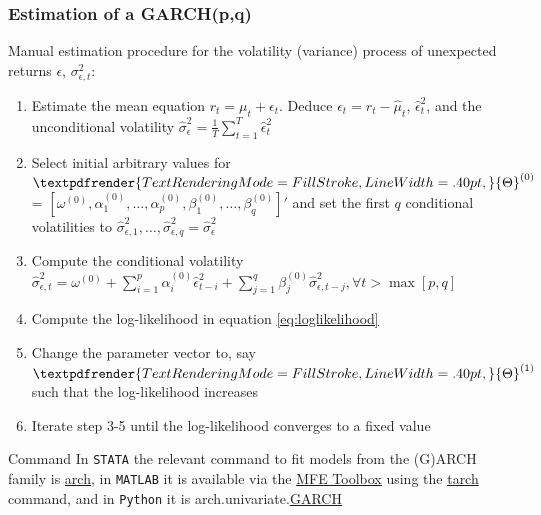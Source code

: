 \documentclass[xcolor=dvipsnames, english, 8pt]{beamer}
\newcommand*{\boldgreek}[1]{%
  \textpdfrender{%
    TextRenderingMode=FillStroke,%
    LineWidth=.40pt,%
  }{#1}%
}
\begin{document}
\begin{frame}
    \frametitle{Estimation of a GARCH(p,q)}
    Manual estimation procedure for the volatility (variance) process of unexpected returns $\epsilon$, $\sigma_{\epsilon,t}^2$:\vspace{0.25cm}\\
\begin{enumerate}[1.]
    \item Estimate the mean equation $r_t = \mu_t + \epsilon_t$. Deduce $\hat{\epsilon}_t = r_t - \hat{\mu}_t$, $\hat{\epsilon}_t^2$,  and the unconditional volatility $\hat{\sigma}_{\epsilon}^2 = \frac{1}{T}\sum_{t=1}^T \hat{\epsilon}_t^2$
    \item Select initial arbitrary values for $\boldgreek{\Theta}^{(0)}$ = $[\omega^{(0)}, \alpha_1^{(0)},\hdots,  \alpha_p^{(0)}, \beta_1^{(0)},\hdots,\beta_q^{(0)}]'$ and set the first $q$ conditional volatilities to $\hat{\sigma}_{\epsilon,1}^2,\hdots,\hat{\sigma}_{\epsilon,q}^2 = \hat{\sigma}_{\epsilon}^2$
    \item Compute the conditional volatility $\hat{\sigma}_{\epsilon,t}^2 = \omega^{(0)} +\sum\limits_{i=1}^p \alpha_i^{(0)}  \hat{\epsilon}_{t-i}^2 + \sum\limits_{j=1}^q \beta_j^{(0)}  \hat{\sigma}_{\epsilon,t-j}^2, \forall t>\max[p,q]$
    \item Compute the log-likelihood in equation \ref{eq:loglikelihood}
    \item Change the parameter vector to, say  $\boldgreek{\Theta}^{(1)}$ such that the log-likelihood increases
    \item Iterate step 3-5 until the log-likelihood converges to a fixed value\vspace{0.5cm}\\
\end{enumerate}

\vfill
\begin{exampleblock}{{\small{Command}}}
In  \texttt{STATA} the relevant command to fit models from the (G)ARCH family is \href{https://www.stata.com/manuals13/tsarch.pdf}{\color{Purple}arch}, in  \texttt{MATLAB} it is available via the \href{https://www.kevinsheppard.com/code/matlab/mfe-toolbox/}{\color{Purple}MFE Toolbox} using the \href{https://www.kevinsheppard.com/files/code/matlab/mfe-toolbox-documentation.pdf}{\color{Purple}tarch} command, and in \texttt{Python} it is arch.univariate.\href{https://arch.readthedocs.io/en/latest/univariate/generated/arch.univariate.GARCH.html\#arch.univariate.GARCH}{\color{Purple}GARCH}
\end{exampleblock}
\end{frame}
\end{document}
